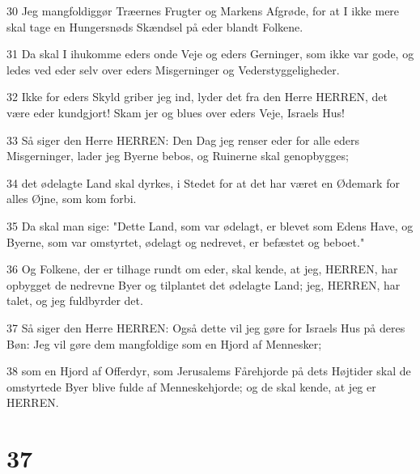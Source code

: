 \par 30 Jeg mangfoldiggør Træernes Frugter og Markens Afgrøde, for at I ikke mere skal tage en Hungersnøds Skændsel på eder blandt Folkene.
\par 31 Da skal I ihukomme eders onde Veje og eders Gerninger, som ikke var gode, og ledes ved eder selv over eders Misgerninger og Vederstyggeligheder.
\par 32 Ikke for eders Skyld griber jeg ind, lyder det fra den Herre HERREN, det være eder kundgjort! Skam jer og blues over eders Veje, Israels Hus!
\par 33 Så siger den Herre HERREN: Den Dag jeg renser eder for alle eders Misgerninger, lader jeg Byerne bebos, og Ruinerne skal genopbygges;
\par 34 det ødelagte Land skal dyrkes, i Stedet for at det har været en Ødemark for alles Øjne, som kom forbi.
\par 35 Da skal man sige: "Dette Land, som var ødelagt, er blevet som Edens Have, og Byerne, som var omstyrtet, ødelagt og nedrevet, er befæstet og beboet."
\par 36 Og Folkene, der er tilhage rundt om eder, skal kende, at jeg, HERREN, har opbygget de nedrevne Byer og tilplantet det ødelagte Land; jeg, HERREN, har talet, og jeg fuldbyrder det.
\par 37 Så siger den Herre HERREN: Også dette vil jeg gøre for Israels Hus på deres Bøn: Jeg vil gøre dem mangfoldige som en Hjord af Mennesker;
\par 38 som en Hjord af Offerdyr, som Jerusalems Fårehjorde på dets Højtider skal de omstyrtede Byer blive fulde af Menneskehjorde; og de skal kende, at jeg er HERREN.

\chapter{37}

